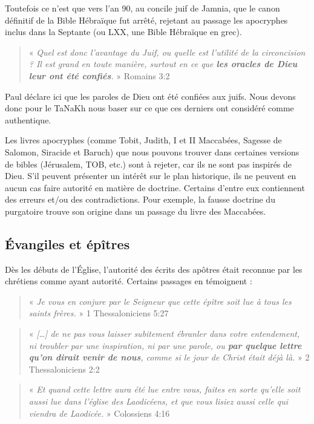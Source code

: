 \begin{small}
Toutefois ce n'est que vers l'an 90, au concile juif de Jamnia, que le canon définitif de la Bible Hébraïque fut arrêté, rejetant au passage les apocryphes inclus dans la Septante (ou LXX, une Bible Hébraïque en grec).

\begin{quote}
« \emph{Quel est donc l'avantage du Juif, ou quelle est l'utilité de la circoncision ? Il est grand en toute manière, surtout en ce que \textbf{les oracles de Dieu leur ont été confiés}.} » Romains 3:2
\end{quote}

Paul déclare ici que les paroles de Dieu ont été confiées aux juifs. Nous devons donc pour le TaNaKh nous baser sur ce que ces derniers ont considéré comme authentique.\bigskip

Les livres apocryphes (comme Tobit, Judith, I et II Maccabées, Sagesse de Salomon, Siracide et Baruch) que nous pouvons trouver dans certaines versions de bibles (Jérusalem, TOB, etc.) sont à rejeter, car ils ne sont pas inspirés de Dieu. S'il peuvent présenter un intérêt sur le plan historique, ils ne peuvent en aucun cas faire autorité en matière de doctrine. Certains d'entre eux contiennent des erreurs et/ou des contradictions. Pour exemple, la fausse doctrine du purgatoire trouve son origine dans un passage du livre des Maccabées.

\subsection*{Évangiles et épîtres}

Dès les débuts de l'Église, l'autorité des écrits des apôtres était reconnue par les chrétiens comme ayant autorité. Certains passages en témoignent :

\begin{quote}
« \emph{Je vous en conjure par le Seigneur que cette épître soit lue à tous les saints frères.} » 1 Thessaloniciens 5:27
\end{quote}

\begin{quote}
« \emph{[…] de ne pas vous laisser subitement ébranler dans votre entendement, ni troubler par une inspiration, ni par une parole, ou \textbf{par quelque lettre qu'on dirait venir de nous}, comme si le jour de Christ était déjà là.} » 2 Thessaloniciens 2:2
\end{quote}

\begin{quote}
« \emph{Et quand cette lettre aura été lue entre vous, faites en sorte qu'elle soit aussi lue dans l'église des Laodicéens, et que vous lisiez aussi celle qui viendra de Laodicée.} » Colossiens 4:16
\end{quote}


\end{small}
